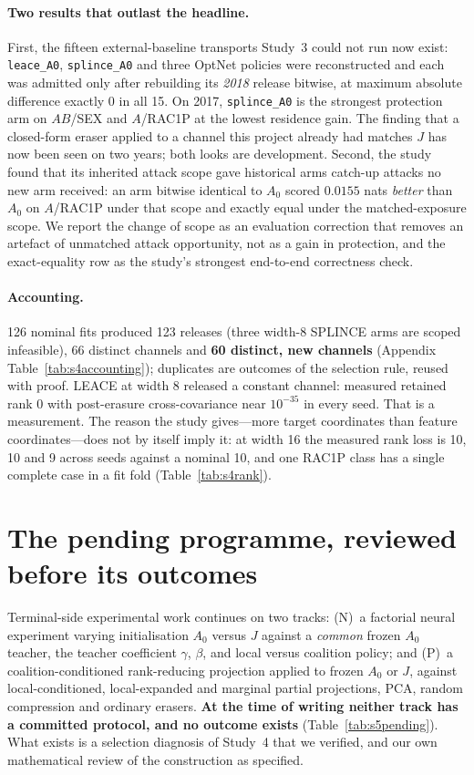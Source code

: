 \documentclass[10pt]{article}
\begin{document}
\paragraph{Two results that outlast the headline.} First, the fifteen external-baseline transports
Study~3 could not run now exist: \texttt{leace\_A0}, \texttt{splince\_A0} and three OptNet policies were
reconstructed and each was admitted only after rebuilding its \emph{2018} release bitwise, at maximum
absolute difference exactly $0$ in all 15. On 2017, \texttt{splince\_A0} is the strongest protection arm on
$AB$/SEX and $A$/RAC1P at the lowest residence gain. The finding that a closed-form eraser applied to a
channel this project already had matches $J$ has now been seen on two years; both looks are development.
Second, the study found that its inherited attack scope gave historical arms catch-up attacks no new arm
received: an arm bitwise identical to $A_0$ scored $0.0155$ nats \emph{better} than $A_0$ on $A$/RAC1P
under that scope and exactly equal under the matched-exposure scope. We report the change of scope as an
evaluation correction that removes an artefact of unmatched attack opportunity, not as a gain in
protection, and the exact-equality row as the study's strongest end-to-end correctness check.

\paragraph{Accounting.} 126 nominal fits produced 123 releases (three width-8 SPLINCE arms are scoped
infeasible), 66 distinct channels and \textbf{60 distinct, new channels} (Appendix
Table~\ref{tab:s4accounting}); duplicates are outcomes of the selection rule, reused with proof. LEACE at
width 8 released a constant channel: measured retained rank 0 with post-erasure cross-covariance near
$10^{-35}$ in every seed. That is a measurement. The reason the study gives---more target coordinates
than feature coordinates---does not by itself imply it: at width 16 the measured rank loss is 10, 10 and
9 across seeds against a nominal 10, and one RAC1P class has a single complete case in a fit fold
(Table~\ref{tab:s4rank}).

\section{The pending programme, reviewed before its outcomes}
\label{sec:pending}

Terminal-side experimental work continues on two tracks: (N)~a factorial neural experiment varying
initialisation $A_0$ versus $J$ against a \emph{common} frozen $A_0$ teacher, the teacher coefficient
$\gamma$, $\beta$, and local versus coalition policy; and (P)~a coalition-conditioned rank-reducing
projection applied to frozen $A_0$ or $J$, against local-conditioned, local-expanded and marginal partial
projections, PCA, random compression and ordinary erasers. \textbf{At the time of writing neither track has
a committed protocol, and no outcome exists} (Table~\ref{tab:s5pending}). What exists is a selection
diagnosis of Study~4 that we verified, and our own mathematical review of the construction as specified.
\end{document}

